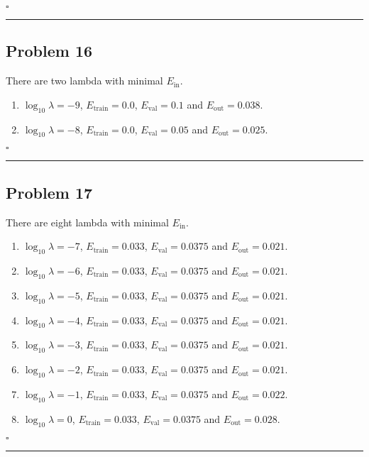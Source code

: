 \documentclass[12pt]{article}
\newcommand*{\QEDB}{\hfill\ensuremath{\square}}
\newcommand{\horrule}[1]{\rule{\linewidth}{#1}}
\begin{document}
\QEDB

\horrule{0.5pt}

\subsection*{Problem 16}

There are two lambda with minimal $E_{\text{in}}$.
\begin{enumerate}
	\item $\log_{10}\lambda=-9$, $E_{\text{train}}=0.0$, $E_{\text{val}}=0.1$ and $E_{\text{out}}=0.038$.
	\item $\log_{10}\lambda=-8$, $E_{\text{train}}=0.0$, $E_{\text{val}}=0.05$ and $E_{\text{out}}=0.025$.
\end{enumerate}

\QEDB

\horrule{0.5pt}

\subsection*{Problem 17}

There are eight lambda with minimal $E_{\text{in}}$.
\begin{enumerate}
	\item $\log_{10}\lambda=-7$, $E_{\text{train}}=0.033$, $E_{\text{val}}=0.0375$ and $E_{\text{out}}=0.021$.
	\item $\log_{10}\lambda=-6$, $E_{\text{train}}=0.033$, $E_{\text{val}}=0.0375$ and $E_{\text{out}}=0.021$.
	\item $\log_{10}\lambda=-5$, $E_{\text{train}}=0.033$, $E_{\text{val}}=0.0375$ and $E_{\text{out}}=0.021$.
	\item $\log_{10}\lambda=-4$, $E_{\text{train}}=0.033$, $E_{\text{val}}=0.0375$ and $E_{\text{out}}=0.021$.
	\item $\log_{10}\lambda=-3$, $E_{\text{train}}=0.033$, $E_{\text{val}}=0.0375$ and $E_{\text{out}}=0.021$.
	\item $\log_{10}\lambda=-2$, $E_{\text{train}}=0.033$, $E_{\text{val}}=0.0375$ and $E_{\text{out}}=0.021$.
	\item $\log_{10}\lambda=-1$, $E_{\text{train}}=0.033$, $E_{\text{val}}=0.0375$ and $E_{\text{out}}=0.022$.
	\item $\log_{10}\lambda=0$, $E_{\text{train}}=0.033$, $E_{\text{val}}=0.0375$ and $E_{\text{out}}=0.028$.
\end{enumerate}

\QEDB

\horrule{0.5pt}
\end{document}
